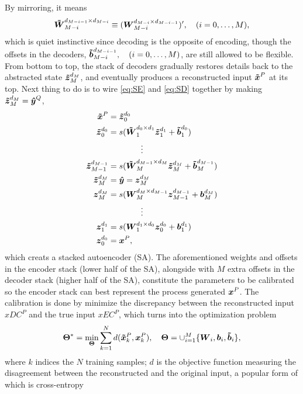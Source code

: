By mirroring, it means
\begin{align}
  \boldsymbol{\tilde{W}}_{M-i}^{d_{M-i-1} \times d_{M-i}} \equiv (\boldsymbol{W}_{M-i}^{d_{M-i} \times d_{M-i-1}})^\prime, \quad (i=0, \dots, M),
\end{align}
which is quiet instinctive since decoding is the opposite of encoding, though the offsets in the decoders, $\boldsymbol{\tilde{b}}_{M-i}^{d_{M-i-1}}, \quad (i=0, \dots, M)$, are still allowed to be flexible. From bottom to top, the stack of decoders gradually restores details back to the abstracted state ${\boldsymbol{\tilde{z}}_{M}^{d_{M}}}$, and eventually produces a reconstructed input $\boldsymbol{\tilde{x}}^P$ at its top. Next thing to do is to wire \ref{eq:SE} and \ref{eq:SD} together by making ${\boldsymbol{\tilde{z}}_{M}^{d_{M}}} = \boldsymbol{\hat{y}}^Q$,
\begin{equation} \label{eq:SA}
  \begin{split}
    \boldsymbol{\tilde{x}}^P &= {\boldsymbol{\tilde{z}}_{0}^{d_{0}}} \\
    {\boldsymbol{\tilde{z}}_{0  }^{d_{0  }}} &= s(\boldsymbol{\tilde{W}}_{1  }^{d_{0  } \times d_{1  }} {\boldsymbol{\tilde{z}}_{1  }^{d_{1  }}} + \boldsymbol{\tilde{b}}_{1}^{d_{0  }}) \\
    & \quad \quad \quad \quad \vdots \\
    {\boldsymbol{\tilde{z}}_{M-1}^{d_{M-1}}} &= s(\boldsymbol{\tilde{W}}_{M  }^{d_{M-1} \times d_{M  }} {\boldsymbol{\tilde{z}}_{M  }^{d_{M  }}} + \boldsymbol{\tilde{b}}_{M}^{d_{M-1}}) \\
    {\boldsymbol{\tilde{z}}_{M  }^{d_{M  }}} &= \boldsymbol{\hat{y}} = {\boldsymbol{z}_{M}^{d_{M}}} \\
    {\boldsymbol{z}_{M  }^{d_{M  }}} &= s(\boldsymbol{W}_{M  }^{d_{M  } \times d_{M-1}} {\boldsymbol{z}_{M-1}^{d_{M-1}}} + \boldsymbol{b}_{M}^{d_{M  }}) \\
    & \quad \quad \quad \quad \vdots \\
    {\boldsymbol{z}_{1  }^{d_{1  }}} &= s(\boldsymbol{W}_{1  }^{d_{1  } \times d_{0  }} {\boldsymbol{z}_{0  }^{d_{0  }}} + \boldsymbol{b}_{1}^{d_{1  }}) \\
    {\boldsymbol{z}_{0  }^{d_{0  }}} &= \boldsymbol{x}^P,
  \end{split}
\end{equation}
which creats a stacked autoencoder (SA)\cite{DL:SDA1}. The aforementioned weights and offsets in the encoder stack (lower half of the SA), alongside with $M$ extra offsets in the decoder stack (higher half of the SA), constitute the parameters to be calibrated so the encoder stack can best represent the process generated $\boldsymbol{x}^P$. The calibration is done by minimize the discrepancy between the reconstructed input $xDC^P$ and the true input $xEC^P$, which turns into the optimization problem
\begin{equation} \label{eq:CE}
  \begin{split}
    \boldsymbol{\Theta}^* = \min_{\boldsymbol{\Theta}} \sum_{k=1}^N{d(\boldsymbol{\tilde{x}}_k^P, \boldsymbol{x}_k^P)}, \quad \boldsymbol{\Theta} = \cup_{i=1}^M \{\boldsymbol{W}_i, \boldsymbol{b}_i, \boldsymbol{\tilde{b}}_i\},
  \end{split}
\end{equation}
where $k$ indices the $N$ training samples; $d$ is the objective function measuring the disagreement between the reconstructed and the original input, a popular form of which is cross-entropy
